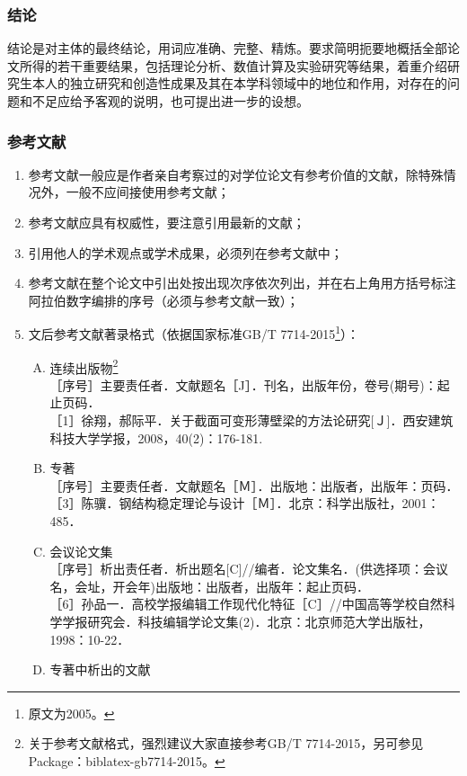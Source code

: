 \subsubsection{结论}
结论是对主体的最终结论，用词应准确、完整、精炼。要求简明扼要地概括全部论文所得的若干重要结果，包括理论分析、数值计算及实验研究等结果，着重介绍研究生本人的独立研究和创造性成果及其在本学科领域中的地位和作用，对存在的问题和不足应给予客观的说明，也可提出进一步的设想。

\subsubsection{参考文献}
\begin{enumerate}[1)]
    \item 参考文献一般应是作者亲自考察过的对学位论文有参考价值的文献，除特殊情况外，一般不应间接使用参考文献；
    \item 参考文献应具有权威性，要注意引用最新的文献；
    \item 引用他人的学术观点或学术成果，必须列在参考文献中；
    \item 参考文献在整个论文中引出处按出现次序依次列出，并在右上角用方括号标注阿拉伯数字编排的序号（必须与参考文献一致）；
    \item 文后参考文献著录格式（依据国家标准GB/T 7714-2015\footnote{原文为2005。}）：
    \begin{enumerate}[A.]
        \item 连续出版物\footnote{关于参考文献格式，强烈建议大家直接参考GB/T 7714-2015，另可参见Package：biblatex-gb7714-2015。}\\
        ［序号］主要责任者．文献题名［J］．刊名，出版年份，卷号(期号)：起止页码．\\
        ［1］徐翔，郝际平．关于截面可变形薄壁梁的方法论研究[Ｊ]．西安建筑科技大学学报，2008，40(2)：176-181.
        \item 专著\\
        ［序号］主要责任者．文献题名［Ｍ］．出版地：出版者，出版年：页码．\\
        ［3］陈骥．钢结构稳定理论与设计［Ｍ］．北京：科学出版社，2001：485．
        \item 会议论文集\\
        ［序号］析出责任者．析出题名[C]//编者．论文集名．(供选择项：会议名，会址，开会年)出版地：出版者，出版年：起止页码．\\
        ［6］孙品一．高校学报编辑工作现代化特征［C］//中国高等学校自然科学学报研究会．科技编辑学论文集(2)．北京：北京师范大学出版社，1998：10-22．
        \item 专著中析出的文献\\

\end{enumerate}
\end{enumerate}
